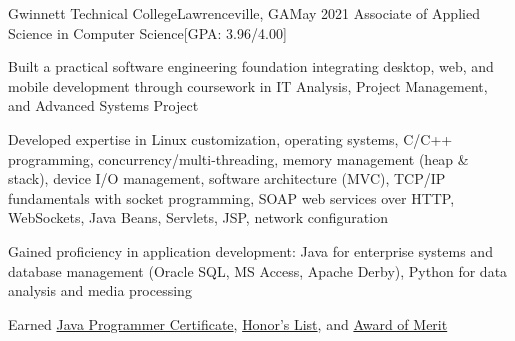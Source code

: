 \begin{resume-itemize}
  {Gwinnett Technical College}{Lawrenceville, GA}{May 2021}
  {Associate of Applied Science in Computer Science}[GPA: 3.96/4.00]
    \item Built a practical software engineering foundation integrating desktop, web, and mobile development through coursework in IT Analysis, Project Management, and Advanced Systems Project
    \item Developed expertise in Linux customization, operating systems, 
    C/C++ programming, concurrency/multi-threading, 
    memory management (heap \& stack), device I/O management,
    software architecture (MVC), 
    TCP/IP fundamentals with socket programming, 
    SOAP web services over HTTP,
    WebSockets, Java Beans, Servlets, JSP, network configuration
    \item Gained proficiency in application development: Java for enterprise systems and database management (Oracle SQL, MS Access, Apache Derby), 
    Python for data analysis and media processing
    \item Earned \href{https://yundaeleesong.github.io/2105-GraduateAward-JavaProgrammer.pdf}{Java Programmer Certificate}, 
    \href{https://yundaeleesong.github.io/1911-HonorsList.pdf}{Honor's List}, and 
    \href{https://yundaeleesong.github.io/2105-MeritAward.pdf}{Award of Merit}
\end{resume-itemize}

